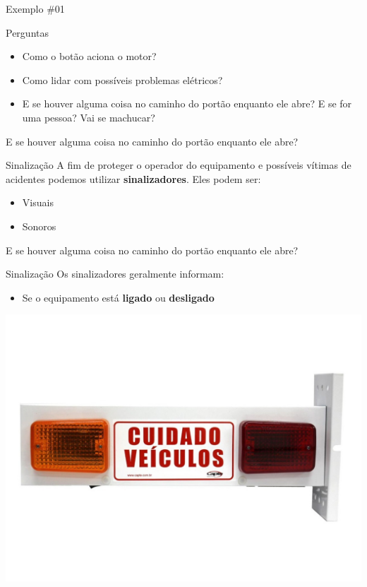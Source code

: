 \begin{frame}{Exemplo \#01}
	\begin{block}{Perguntas}
		\begin{itemize}
			\item Como o botão aciona o motor? \checkmark
			\item Como lidar com possíveis problemas elétricos? \checkmark
			\item E se houver alguma coisa no caminho do portão enquanto ele abre? E se for uma pessoa? Vai se machucar?
		\end{itemize}
	\end{block}
\end{frame}


\begin{frame}{E se houver alguma coisa no caminho do portão enquanto ele abre?}
	\begin{block}{Sinalização}
		A fim de proteger o operador do equipamento e possíveis vítimas de acidentes podemos utilizar \textbf{sinalizadores}. Eles podem ser:
		\begin{itemize}
			\item Visuais
			\item Sonoros
		\end{itemize}
	\end{block}
\end{frame}

\begin{frame}{E se houver alguma coisa no caminho do portão enquanto ele abre?}
	\begin{block}{Sinalização}
		Os sinalizadores geralmente informam:
		\begin{itemize}
			\item Se o equipamento está \textbf{ligado} ou \textbf{desligado}
		\end{itemize}
	\end{block}
	\centerline{\includegraphics[width=0.7\linewidth]{Figuras/Ch05/fig15.jpg}}
\end{frame}


